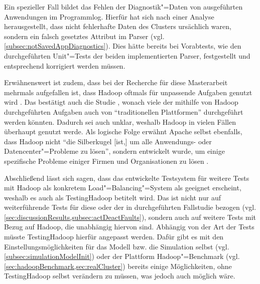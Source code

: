 Ein spezieller Fall bildet das Fehlen der Diagnostik"=Daten von ausgeführten Anwendungen im Programmlog.
Hierfür hat sich nach einer Analyse herausgestellt, dass nicht fehlerhafte Daten des Clusters ursächlich waren, sondern ein falsch gesetztes Attribut im Parser (vgl. \cref{subsec:notSavedAppDiagnostics}).
Dies hätte bereits bei Vorabtests, wie den durchgeführten Unit"=Tests der beiden implementierten Parser, festgestellt und entsprechend korrigiert werden müssen.

Erwähnenswert ist zudem, dass bei der Recherche für diese Masterarbeit mehrmals aufgefallen ist, dass Hadoop oftmals für unpassende Aufgaben genutzt wird \cite{Ren2013,Vavilapalli2013}.
Das bestätigt auch die Studie \cite{HadoopDataTypes}, wonach viele der mithilfe von Hadoop durchgeführten Aufgaben auch von \enquote{traditionellen Plattformen} durchgeführt werden könnten.
Dadurch sei auch unklar, weshalb Hadoop in vielen Fällen überhaupt genutzt werde.
Als logische Folge erwähnt Apache selbst ebenfalls, dass Hadoop nicht \enquote{die Silberkugel [ist,] um alle Anwendungs- oder Datencenter"=Probleme zu lösen}, sondern entwickelt wurde, um einige spezifische Probleme einiger Firmen und Organisationen zu lösen \cite{HadoopIsNot}.

Abschließend lässt sich sagen, dass das entwickelte Testsystem für weitere Tests mit Hadoop als konkretem Load"=Balancing"=System als geeignet erscheint, weshalb es auch als TestingHadoop betitelt wird.
Das ist nicht nur auf weiterführende Tests für diese oder der in \cite{Eberhardinger2018} durchgeführten Fallstudie bezogen (vgl. \cref{sec:discussionResults,subsec:actDeactFaults}), sondern auch auf weitere Tests mit Bezug auf Hadoop, die unabhängig hiervon sind.
Abhängig von der Art der Tests müsste TestingHadoop  hierfür angepasst werden.
Dafür gibt es mit den Einstellungsmöglichkeiten für das Modell bzw. die Simulation selbst (vgl. \cref{subsec:simulationModelInit}) oder der Plattform Hadoop"=Benchmark (vgl. \cref{sec:hadoopBenchmark,sec:realCluster}) bereits einige Möglichkeiten, ohne TestingHadoop selbst verändern zu müssen, was jedoch auch möglich wäre.

